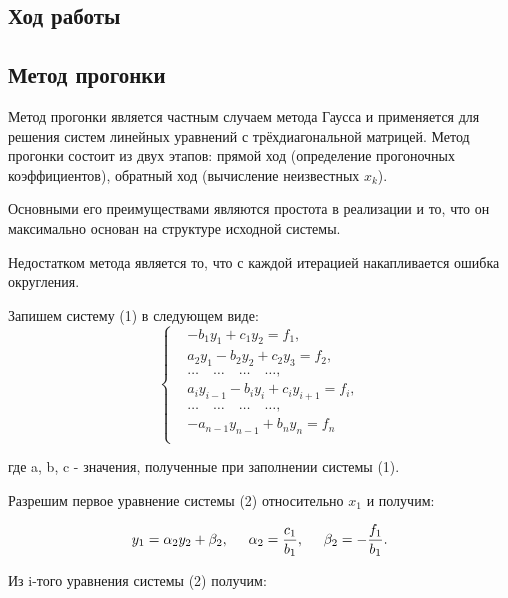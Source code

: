 \documentclass[a4paper,12pt]{article}
\begin{document}
\begin{center}
\section{Ход работы}
\end{center}
\subsection{Метод прогонки}

\hspace{1cm} Метод прогонки является частным случаем метода Гаусса и применяется
для решения систем линейных уравнений с трёхдиагональной матрицей. 
Метод прогонки состоит из двух этапов: прямой ход (определение прогоночных коэффициентов), обратный ход (вычисление неизвестных $x_k$).

Основными его преимуществами являются простота в реализации и то, что он максимально основан на структуре исходной системы.

Недостатком метода является то, что с каждой итерацией накапливается ошибка округления.

Запишем систему (1) в следующем виде:
\begin{equation}
  \begin{cases}
      &-b_1 y_1 + c_1 y_2 = f_1,\\
      &a_2 y_1 - b_2 y_2 + c_2 y_3 = f_2,\\
      &\dots \quad \dots \quad \dots \quad \dots,\\
      &a_i y_{i-1} - b_i y_i + c_i y_{i+1} = f_i,\\
      &\dots \quad \dots \quad \dots \quad \dots,\\
      &-a_{n-1} y_{n-1} + b_n y_n = f_n\\
  \end{cases}
\end{equation}

где a, b, c - значения, полученные при заполнении системы (1).

Разрешим первое уравнение системы (2) относительно $x_1$ и получим:

\begin{equation*}
  y_1 = \alpha_2 y_2 + \beta_2, \hspace{0.5cm} \alpha_2 = \frac{c_1}{b_1}, \hspace{0.5cm} \beta_2 = -\frac{f_1}{b_1}.
\end{equation*}

Из i-того уравнения системы (2) получим:
\end{document}

